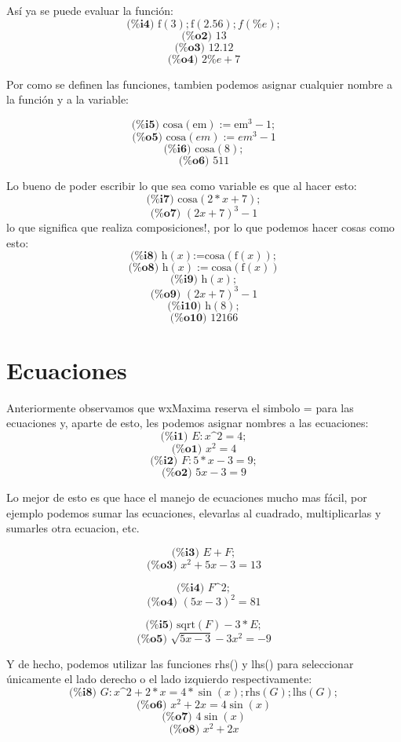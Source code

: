 \documentclass{article}
\begin{document}
Así ya se puede evaluar la función:
\[ \textbf{(\%i4) }\text{f}(3);\text{f}(2.56);f(\%e); \]
\[ \textbf{(\%o2) }13 \]
\[ \textbf{(\%o3) }12.12 \]
\[ \textbf{(\%o4) }2 \%e +7 \]

Por como se definen las funciones, tambien podemos asignar cualquier nombre a la función y a la variable:

\[ \textbf{(\%i5) }\text{cosa}(\text{em}):=\text{em}^3-1; \]
\[ \textbf{(\%o5) }\text{cosa}(em):=em^3-1 \]
\[ \textbf{(\%i6) }\text{cosa}(8); \]
\[ \textbf{(\%o6) }511 \]

\newpage

Lo bueno de poder escribir lo que sea como variable es que al hacer esto:
\[ \textbf{(\%i7) }\text{cosa}(2*x+7); \]
\[ \textbf{(\%o7) }(2x+7)^3-1 \]
lo que significa que realiza composiciones!, por lo que podemos hacer cosas como esto:
\[ \textbf{(\%i8) }\text{h}(x)\text{:=}\text{cosa}(\text{f}(x)); \]
\[ \textbf{(\%o8) }\text{h}(x):=\text{cosa}(\text{f}(x)) \]
\[ \textbf{(\%i9) }\text{h}(x); \]
\[ \textbf{(\%o9) }(2x+7)^3-1 \]
\[ \textbf{(\%i10) }\text{h}(8);\]
\[ \textbf{(\%o10) }12166\]

\section{Ecuaciones}

Anteriormente observamos que wxMaxima reserva el simbolo = para las ecuaciones y, aparte de esto, les podemos asignar nombres a las ecuaciones:
\[ \textbf{(\%i1) }E:x\text{\textasciicircum}2=4; \]
\[ \textbf{(\%o1) }x^2=4 \]
\[ \textbf{(\%i2) }F:5*x-3=9;\]
\[ \textbf{(\%o2) }5x-3=9\]

Lo mejor de esto es que hace el manejo de ecuaciones mucho mas fácil, por ejemplo podemos sumar las ecuaciones, elevarlas al cuadrado, multiplicarlas y sumarles otra ecuacion, etc.

\[ \textbf{(\%i3) }E+F; \]
\[ \textbf{(\%o3) }x^2+5x-3=13 \]

\[ \textbf{(\%i4) }F\text{\textasciicircum}2; \]
\[ \textbf{(\%o4) }(5x-3)^2=81 \]

\[ \textbf{(\%i5) }\text{sqrt}(F)-3*E; \]
\[ \textbf{(\%o5) }\sqrt{5x-3}-3x^2=-9 \]

Y de hecho, podemos utilizar las funciones rhs() y lhs() para seleccionar únicamente el lado derecho o el lado izquierdo respectivamente:
\[ \textbf{(\%i8) }G:x\text{\textasciicircum}2+2*x=4*\sin(x); \text{rhs}(G); \text{lhs}(G); \]
\[ \textbf{(\%o6) }x^2+2x=4\sin(x) \]
\[ \textbf{(\%o7) }4\sin(x) \]
\[ \textbf{(\%o8) }x^2+2x \]
\end{document}
